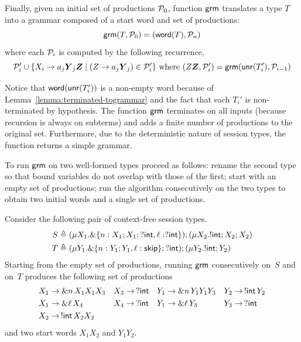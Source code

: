 
Finally, given an initial set of productions $\mathcal P_0$, function
$\mathsf{grm}$ translates a type $T$ into a grammar composed of a start word
and set of productions:
%
\begin{equation*}
  \mathsf{grm}(T,\mathcal P_0) = (\mathsf{word}(T), \mathcal P_n)
\end{equation*}
%
where each $\mathcal P_i$ is computed by the following recurrence,
\begin{equation*}
                       \productions_i' \cup \{X_i \rightarrow a_j\vec
                       Y_j \vec Z \mid (Z \rightarrow a_j \vec Y_j)\in
                       \productions_i'\} \text{ where }(Z \vec Z, \productions_i')=\grm(\Unravel(T_i'), \productions_{i-1})
\end{equation*}

Notice that $\mathsf{word}(\mathsf{unr}(T_i'))$ is a non-empty word because of
Lemma~\ref{lemma:terminated-togrammar} and the fact that each $T_i'$
is non-terminated by hypothesis.  The function $\mathsf{grm}$ terminates on
all inputs (because recursion is always on subterms) and adds a finite
number of productions to the original set. Furthermore, due to the
deterministic nature of session types, the function returns a simple
grammar.

To run $\mathsf{grm}$ on two well-formed types proceed as follows: rename the
second type so that bound variables do not overlap with those of the
first; start with an empty set of productions; run the algorithm
consecutively on the two types to obtain two initial words and a
single set of productions.

\begin{example}
  \label{ex:productions}
  Consider the following pair of context-free session types.
  \begin{align*}
    S & \triangleq (\mu X_1. \&\{n: X_1;X_1;?\mathsf{int}, \ell: ?\mathsf{int}\});(\mu X_2. !\mathsf{int} ; X_2;X_2)\\
    T & \triangleq (\mu Y_1. \&\{n: Y_1;Y_1, \ell: \mathsf{skip}\};?\mathsf{int});(\mu Y_2. !\mathsf{int} ; Y_2)
  \end{align*}
  Starting from the empty set of productions, running $\mathsf{grm}$
  consecutively on~$S$ and on~$T$ produces the following set of
  productions
  \begin{align*}
    X_1 &\rightarrow \& n\, X_1 X_1 X_3 & X_3 &\rightarrow \,? \mathsf{int} &
    Y_1 &\rightarrow \& n\, Y_1 Y_1 Y_3 & Y_2 &\rightarrow \,!\mathsf{int}\, Y_2 
    \\
    X_1 &\rightarrow \& \ell\, X_4           & X_4 &\rightarrow \,? \mathsf{int} &
    Y_1 &\rightarrow \& \ell \,Y_3           & Y_3 &\rightarrow \,? \mathsf{int}
    \\
    X_2 &\rightarrow \,!\mathsf{int}\, X_2 X_2
  \end{align*}
  and two start words $X_1X_2$ and $Y_1Y_2$.
\end{example}

